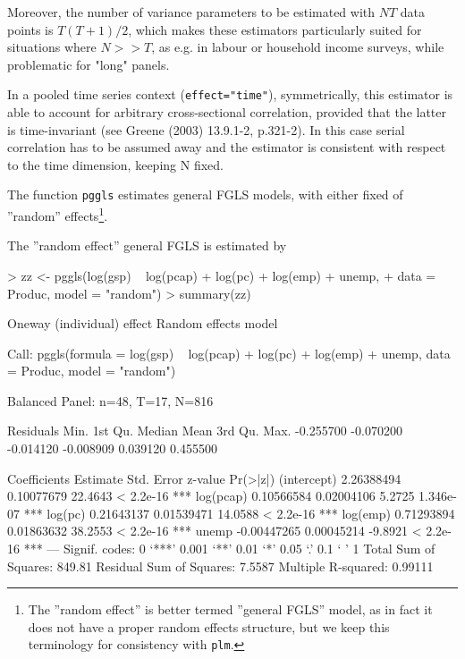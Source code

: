 \documentclass[a4paper]{article}
\begin{document}
Moreover, the number of variance parameters to be estimated with $NT$ data points is $T(T+1)/2$, which makes these estimators particularly suited for situations where $N>>T$, as e.g. in labour or household income surveys, while problematic for "long" panels. 

In a pooled time series context (\texttt{effect="time"}), symmetrically, this estimator is able to account for arbitrary cross-sectional correlation, provided that the latter is time-invariant (see Greene (2003) 13.9.1-2, p.321-2). In this case serial correlation has to be assumed away and the estimator is consistent with respect to the time dimension, keeping N fixed.

The function \texttt{pggls} estimates general FGLS models, with either fixed of ''random'' effects\footnote{The ''random effect'' is better termed ''general FGLS'' model, as in fact it does not have a proper random effects structure, but we keep this terminology for consistency with \texttt{plm}.}. 

The ''random effect'' general FGLS is estimated by
 
\begin{Schunk}
\begin{Sinput}
> zz <- pggls(log(gsp) ~ log(pcap) + log(pc) + log(emp) + unemp, 
+     data = Produc, model = "random")
> summary(zz)
\end{Sinput}
\begin{Soutput}
Oneway (individual) effect Random effects model

Call:
pggls(formula = log(gsp) ~ log(pcap) + log(pc) + log(emp) + unemp, 
    data = Produc, model = "random")

Balanced Panel: n=48, T=17, N=816

Residuals
     Min.   1st Qu.    Median      Mean   3rd Qu.      Max. 
-0.255700 -0.070200 -0.014120 -0.008909  0.039120  0.455500 

Coefficients
               Estimate  Std. Error z-value  Pr(>|z|)    
(intercept)  2.26388494  0.10077679 22.4643 < 2.2e-16 ***
log(pcap)    0.10566584  0.02004106  5.2725 1.346e-07 ***
log(pc)      0.21643137  0.01539471 14.0588 < 2.2e-16 ***
log(emp)     0.71293894  0.01863632 38.2553 < 2.2e-16 ***
unemp       -0.00447265  0.00045214 -9.8921 < 2.2e-16 ***
---
Signif. codes:  0 ‘***’ 0.001 ‘**’ 0.01 ‘*’ 0.05 ‘.’ 0.1 ‘ ’ 1 
Total Sum of Squares: 849.81
Residual Sum of Squares: 7.5587
Multiple R-squared: 0.99111
\end{Soutput}
\end{Schunk}
\end{document}
